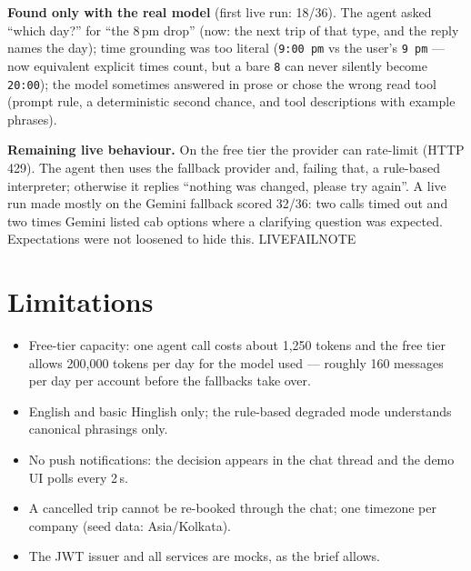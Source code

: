 \documentclass[10.5pt,a4paper]{article}
\begin{document}
\textbf{Found only with the real model} (first live run: 18/36). The agent asked ``which day?'' for ``the 8\,pm drop''
(now: the next trip of that type, and the reply names the day); time grounding was too literal (\texttt{9:00 pm} vs
the user's \texttt{9 pm} --- now equivalent explicit times count, but a bare \texttt{8} can never silently become
\texttt{20:00}); the model sometimes answered in prose or chose the wrong read tool (prompt rule, a deterministic
second chance, and tool descriptions with example phrases).

\textbf{Remaining live behaviour.} On the free tier the provider can rate-limit (HTTP 429). The agent then uses the
fallback provider and, failing that, a rule-based interpreter; otherwise it replies ``nothing was changed, please try
again''. A live run made mostly on the Gemini fallback scored 32/36: two calls timed out and two times Gemini listed
cab options where a clarifying question was expected. Expectations were not loosened to hide this.
LIVEFAILNOTE

\section{Limitations}
\begin{itemize}
\item Free-tier capacity: one agent call costs about 1{,}250 tokens and the free tier allows 200{,}000 tokens per day
  for the model used --- roughly 160 messages per day per account before the fallbacks take over.
\item English and basic Hinglish only; the rule-based degraded mode understands canonical phrasings only.
\item No push notifications: the decision appears in the chat thread and the demo UI polls every 2\,s.
\item A cancelled trip cannot be re-booked through the chat; one timezone per company (seed data: Asia/Kolkata).
\item The JWT issuer and all services are mocks, as the brief allows.
\end{itemize}
\end{document}
